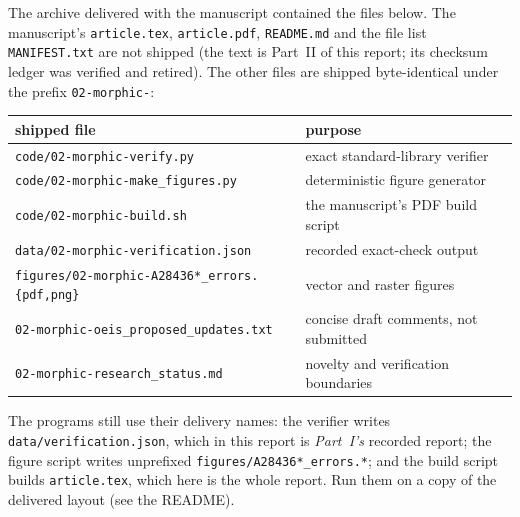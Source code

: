 \documentclass[11pt]{article}
\numberwithin{equation}{section}
\theoremstyle{definition}
\theoremstyle{remark}
\begin{document}
The archive delivered with the manuscript contained the files below. The
manuscript's \texttt{article.tex}, \texttt{article.pdf}, \texttt{README.md}
and the file list \texttt{MANIFEST.txt} are not shipped (the text is Part~II
of this report; its checksum ledger was verified and retired). The other
files are shipped byte-identical under the prefix \texttt{02-morphic-}:
\begin{center}
\small
\begin{tabular}{@{}ll@{}}
\toprule
shipped file & purpose \\
\midrule
\texttt{code/02-morphic-verify.py} & exact standard-library verifier \\
\texttt{code/02-morphic-make\_figures.py} & deterministic figure generator \\
\texttt{code/02-morphic-build.sh} & the manuscript's PDF build script \\
\texttt{data/02-morphic-verification.json} & recorded exact-check output \\
\texttt{figures/02-morphic-A28436*\_errors.\{pdf,png\}} & vector and raster figures \\
\texttt{02-morphic-oeis\_proposed\_updates.txt} & concise draft comments, not submitted \\
\texttt{02-morphic-research\_status.md} & novelty and verification boundaries \\
\bottomrule
\end{tabular}
\end{center}
The programs still use their delivery names: the verifier writes
\texttt{data/verification.json}, which in this report is \emph{Part~I's}
recorded report; the figure script writes unprefixed
\texttt{figures/A28436*\_errors.*}; and the build script builds
\texttt{article.tex}, which here is the whole report. Run them on a copy of
the delivered layout (see the README).
\end{document}
